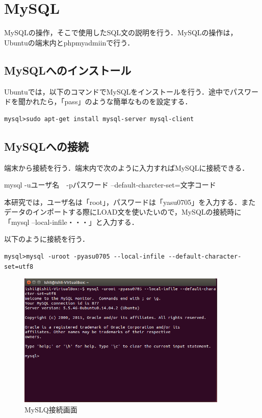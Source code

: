 \section{MySQL}

MySQLの操作，そこで使用したSQL文の説明を行う．MySQLの操作は，Ubuntuの端末内とphpmyadmiinで行う．

\subsection{MySQLへのインストール}

Ubuntuでは，以下のコマンドでMySQLをインストールを行う．途中でパスワードを聞かれたら，「pass」のような簡単なものを設定する． \\
{\small
\begin{verbatim}
mysql>sudo apt-get install mysql-server mysql-client
\end{verbatim}}


\subsection{MySQLへの接続}

端末から接続を行う．端末内で次のように入力すればMySQLに接続できる．

mysql -uユーザ名　-pパスワード --default-charcter-set=文字コード

本研究では，ユーザ名は「root」，パスワードは「yasu0705」を入力する．またデータのインポートする際にLOAD文を使いたいので，MySQLの接続時に「mysql --local-infile・・・」と入力する．

以下のように接続を行う． 

{\small
\begin{verbatim}
mysql>mysql -uroot -pyasu0705 --local-infile --default-character-set=utf8
\end{verbatim}}

\begin{figure}[H]
\centering
\includegraphics[width=10cm]{MySQL_connection.png}
\caption{MySLQ接続画面}\label{サンプル図}
\end{figure}

